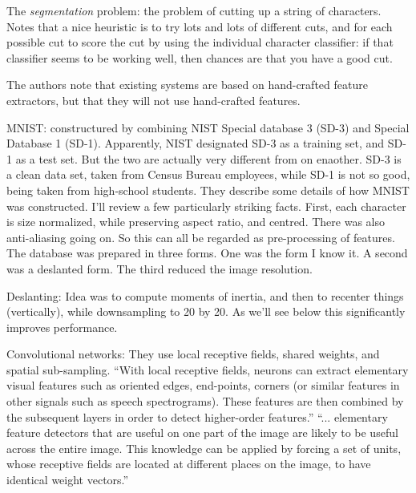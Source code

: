 \documentclass[12pt]{article}
\begin{document}
The \emph{segmentation} problem: the problem of cutting up a string of
characters.  Notes that a nice heuristic is to try lots and lots of
different cuts, and for each possible cut to score the cut by using
the individual character classifier: if that classifier seems to be
working well, then chances are that you have a good cut.

The authors note that existing systems are based on hand-crafted
feature extractors, but that they will not use hand-crafted features.

MNIST: constructured by combining NIST Special database 3 (SD-3) and
Special Database 1 (SD-1).  Apparently, NIST designated SD-3 as a
training set, and SD-1 as a test set.  But the two are actually very
different from on enaother.  SD-3 is a clean data set, taken from
Census Bureau employees, while SD-1 is not so good, being taken from
high-school students.  They describe some details of how MNIST was
constructed.  I'll review a few particularly striking facts.  First,
each character is size normalized, while preserving aspect ratio, and
centred.  There was also anti-aliasing going on.  So this can all be
regarded as pre-processing of features.  The database was prepared in
three forms.  One was the form I know it.  A second was a deslanted
form.  The third reduced the image resolution.

Deslanting: Idea was to compute moments of inertia, and then to
recenter things (vertically), while downsampling to 20 by 20.  As
we'll see below this significantly improves performance.

Convolutional networks: They use local receptive fields, shared
weights, and spatial sub-sampling.  ``With local receptive fields,
neurons can extract elementary visual features such as oriented edges,
end-points, corners (or similar features in other signals such as
speech spectrograms).  These features are then combined by the
subsequent layers in order to detect higher-order features.''
``... elementary feature detectors that are useful on one part of the
image are likely to be useful across the entire image.  This knowledge
can be applied by forcing a set of units, whose receptive fields are
located at different places on the image, to have identical weight
vectors.''
\end{document}
